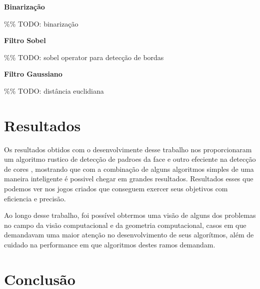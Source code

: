 \documentclass[a4paper]{article}
\begin{document}
\begin{flushleft}
\textbf{\large Binarização}
\end{flushleft}
\%\% TODO: binarização

\begin{flushleft}
\textbf{\large Filtro Sobel}
\end{flushleft}
\%\% TODO: sobel operator para detecção de bordas

\begin{flushleft}
\textbf{\large Filtro Gaussiano}
\end{flushleft}
\%\% TODO: distância euclidiana





\section{ Resultados}

Os resultados obtidos com o desenvolvimente desse trabalho nos proporcionaram um algoritmo rustico de detecção de padroes da face e outro efeciente na detecção de cores , mostrando que com a combinação de alguns algoritmos simples de uma maneira inteligente é possivel chegar em grandes resultados. Resultados esses que podemos ver nos jogos criados que conseguem exercer seus objetivos com eficiencia e precisão.

Ao longo desse trabalho, foi possível obtermos uma visão de alguns dos problemas no campo da visão computacional e da geometria computacional, casos em que demandavam uma maior atenção no desenvolvimento de seus algorítmos, além de cuidado na performance em que algoritmos destes ramos demandam.


\section{Conclusão}
\end{document}
